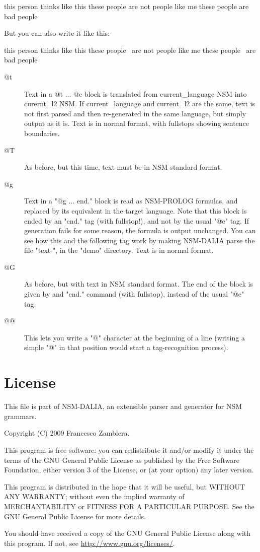 \documentclass[11pt]{article}
\begin{document}
\begin{code}
this person thinks like this
    these people are not people like me
    these people are bad people
\end{code}

But you can also write it like this:

\begin{code}
this person thinks like this
    these people \
            are not people like me
    these people \
            are bad people
\end{code}

\begin{description}
    \item[@t] 
Text in a @t ... @e block is translated from current_language NSM into
curernt_l2 NSM. If current_language and current_l2 are the same, text
is not first parsed and then re-generated in the same language, but
simply output as it is. Text is in normal format, with fullstops
showing sentence boundaries.
    \item[@T] 
As before, but this time, text must be in NSM standard format.
    \item[@g] 
Text in a "@g ... end." block is read as NSM-PROLOG formulas, and
replaced by its equivalent in the target language. Note that this
block is ended by an "end." tag (with fullstop!), and not by the usual
"@e" tag. If generation fails for some reason, the formula is output
unchanged. You can see how this and the following tag work by making
NSM-DALIA parse the file "text-\file{gen.txt}", in the "demo" directory. Text
is in normal format.
    \item[@G] 
As before, but with text in NSM standard format. The end of the block
is given by and "end." command (with fullstop), instead of the usual
"@e" tag.
    \item[@@] 
This lets you write a "@" character at the beginning of a line
(writing a simple "@" in that position would start a tag-recognition
process).
\end{description}

\section{License}

This file is part of NSM-DALIA, an extensible parser and generator
for NSM grammars.

Copyright (C) 2009 Francesco Zamblera.

This program is free software: you can redistribute it and/or modify
it under the terms of the GNU General Public License as published by
the Free Software Foundation, either version 3 of the License, or
(at your option) any later version.

This program is distributed in the hope that it will be useful,
but WITHOUT ANY WARRANTY; without even the implied warranty of
MERCHANTABILITY or FITNESS FOR A PARTICULAR PURPOSE. See the
GNU General Public License for more details.

You should have received a copy of the GNU General Public License
along with this program. If not, see \url{http://www.gnu.org/licenses/}.
\printindex
\end{document}
